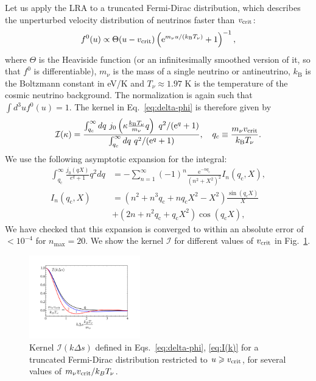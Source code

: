 \documentclass[useAMS, usenatbib]{mnras}
\newcommand{\barr}{\begin{eqnarray}}
\newcommand{\earr}{\end{eqnarray}}
\newcommand{\rme}{\textrm{e}}
\begin{document}
Let us apply the LRA to a truncated Fermi-Dirac distribution, which describes the unperturbed velocity distribution of neutrinos faster than $v_{\rm crit}$:
\begin{equation}
f^0(u) \propto \Theta(u - v_{\rm crit}) \left(\rme^{m_\nu u/ \left(k_\mathrm{B} T_\nu\right)} + 1 \right)^{-1},
\end{equation}
where $\Theta$ is the Heaviside function (or an infinitesimally smoothed version of it, so that $f^0$ is differentiable), $m_\nu$ is the mass of a single neutrino or antineutrino, $k_\mathrm{B}$ is the Boltzmann constant in eV/K and $T_\nu \approx 1.97$ K is the temperature of the cosmic neutrino background. The normalization is again such that $\int d^3 u f^0(u) = 1$. The kernel in Eq.~\eqref{eq:delta-phi} is therefore given by
\barr
\mathcal{I}(\kappa) = \frac{\int_{q_c}^{\infty} dq~ j_0\left(\kappa \frac{k_\mathrm{B} T_\nu}{m_\nu}q\right)~ q^2 /(\rme^q + 1) }{\int_{q_c}^{\infty} dq ~q^2/(\rme^q + 1)}, \ \ \ q_c \equiv \frac{m_\nu v_{\rm crit}}{k_\mathrm{B} T_\nu}.
\earr
We use the following asymptotic expansion for the integral:
\begin{align}
 \int^\infty_{q_\mathrm{c}} \frac{j_0(qX)}{e^q + 1} q^2 dq &= - \sum^{\infty}_{n=1} (-1)^n \frac{\rme^{-n q_\mathrm{c}}}{(n^2+X^2)^2} I_n(q_\mathrm{c},X),\\
 I_n(q_\mathrm{c},X) &= \left(n^2 + n^3 q_\mathrm{c} + n q_\mathrm{c} X^2 - X^2\right) \frac{\sin(q_\mathrm{c} X)}{X} \nonumber \\
 &+ \left(2n + n^2 q_\mathrm{c} + q_\mathrm{c} X^2\right) \cos(q_\mathrm{c} X),
\end{align}
We have checked that this expansion is converged to within an absolute error of $< 10^{-4}$ for $n_\mathrm{max} = 20$. We show the kernel $\mathcal{I}$ for different values of $v_{\rm crit}$ in Fig.~\ref{fig:kernel}.

\begin{figure}
\includegraphics[width=0.43\textwidth]{nuplots/kernel.pdf}
\caption{Kernel $\mathcal{I}(k \Delta s)$ defined in Eqs.~\eqref{eq:delta-phi}, \eqref{eq:I(k)} for a truncated Fermi-Dirac distribution restricted to $u \geq v_{\rm crit}$, for several values of $m_\nu v_{\rm crit}/k_B T_\nu$. }
\label{fig:kernel}
\end{figure}
\end{document}
